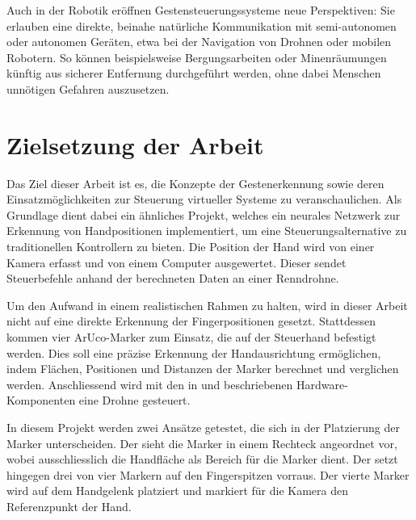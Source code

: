 Auch in der Robotik eröffnen Gestensteuerungssysteme neue Perspektiven: Sie erlauben eine direkte, beinahe natürliche Kommunikation mit semi-autonomen oder autonomen Geräten, etwa bei der Navigation von Drohnen oder mobilen Robotern.
So können beispielsweise Bergungsarbeiten oder Minenräumungen künftig aus sicherer Entfernung durchgeführt werden, ohne dabei Menschen unnötigen Gefahren auszusetzen.

\section{Zielsetzung der Arbeit}
Das Ziel dieser Arbeit ist es, die Konzepte der Gestenerkennung sowie deren Einsatzmöglichkeiten zur Steuerung virtueller Systeme zu veranschaulichen.
Als Grundlage dient dabei ein ähnliches Projekt, welches ein neurales Netzwerk zur Erkennung von Handpositionen implementiert, um eine Steuerungsalternative zu traditionellen Kontrollern zu bieten.
Die Position der Hand wird von einer Kamera erfasst und von einem Computer ausgewertet.
Dieser sendet Steuerbefehle anhand der berechneten Daten an einer Renndrohne.~\cite{arxiv:OmniRace}

Um den Aufwand in einem realistischen Rahmen zu halten, wird in dieser Arbeit nicht auf eine direkte Erkennung der Fingerpositionen gesetzt.
Stattdessen kommen vier ArUco-Marker zum Einsatz, die auf der Steuerhand befestigt werden.
Dies soll eine präzise Erkennung der Handausrichtung ermöglichen, indem Flächen, Positionen und Distanzen der Marker berechnet und verglichen werden.
Anschliessend wird mit den in  und  beschriebenen Hardware-Komponenten eine Drohne gesteuert.

In diesem Projekt werden zwei Ansätze getestet, die sich in der Platzierung der Marker unterscheiden.
Der  sieht die Marker in einem Rechteck angeordnet vor, wobei ausschliesslich die Handfläche als Bereich für die Marker dient.
Der  setzt hingegen drei von vier Markern auf den Fingerspitzen vorraus.
Der vierte Marker wird auf dem Handgelenk platziert und markiert für die Kamera den Referenzpunkt der Hand.

